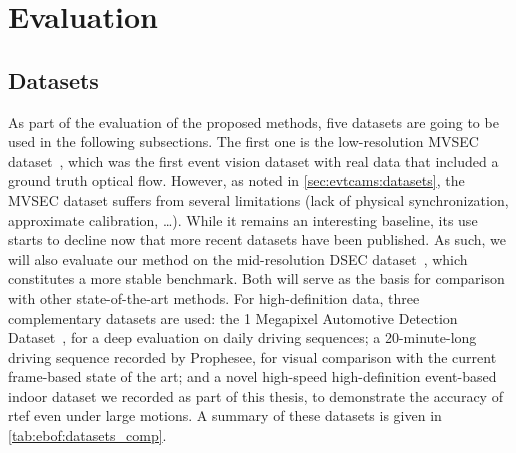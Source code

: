 \section{Evaluation}\label{sec:ebof:eval}

\subsection{Datasets}

As part of the evaluation of the proposed methods, five datasets are going to be used in the following subsections. The first one is the low-resolution MVSEC dataset~\cite{Zhu2018EVFlowNetSO,Zhu2018TheMS}, which was the first event vision dataset with real data that included a ground truth optical flow. However, as noted in \cref{sec:evtcams:datasets}, the MVSEC dataset suffers from several limitations (lack of physical synchronization, approximate calibration, \dots). While it remains an interesting baseline, its use starts to decline now that more recent datasets have been published. As such, we will also evaluate our method on the mid-resolution DSEC dataset~\cite{Gehrig2021DSECAS}, which constitutes a more stable benchmark. Both will serve as the basis for comparison with other state-of-the-art methods. For high-definition data, three complementary datasets are used: the 1 Megapixel Automotive Detection Dataset~\cite{Perot2020LearningTD}, for a deep evaluation on daily driving sequences; a 20-minute-long driving sequence recorded by Prophesee, for visual comparison with the current frame-based state of the art; and a novel high-speed high-definition event-based indoor dataset we recorded as part of this thesis, to demonstrate the accuracy of \acrshort{rtef} even under large motions. A summary of these datasets is given in \cref{tab:ebof:datasets_comp}.

\begin{table}[ht]
  \centering
  \caption{Comparison of the event-based datasets used for the evaluation of our optical flow method \acrshort{rtef}.}\label{tab:ebof:datasets_comp}
\end{table}

